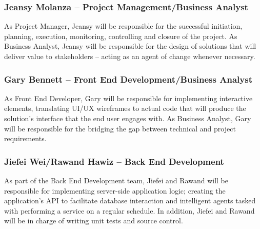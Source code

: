 \subsubsection{Jeansy Molanza -- Project Management/Business Analyst}

As Project Manager, Jeansy will be responsible for the successful initiation, planning, execution, monitoring, controlling and closure of the project. As Business Analyst, Jeansy will be responsible for the design of solutions that will deliver value to stakeholders -- acting as an agent of change whenever necessary.

\subsubsection{Gary Bennett -- Front End Development/Business Analyst}

As Front End Developer, Gary will be responsible for implementing interactive elements, translating UI/UX wireframes to actual code that will produce the solution's interface that the end user engages with. As Business Analyst, Gary will be responsible for the bridging the gap between technical and project requirements.

\subsubsection{Jiefei Wei/Rawand Hawiz -- Back End Development}

As part of the Back End Development team, Jiefei and Rawand will be responsible for implementing server-side application logic; creating the application's API to facilitate database interaction and intelligent agents tasked with performing a service on a regular schedule. In addition, Jiefei and Rawand will be in charge of writing unit tests and source control.